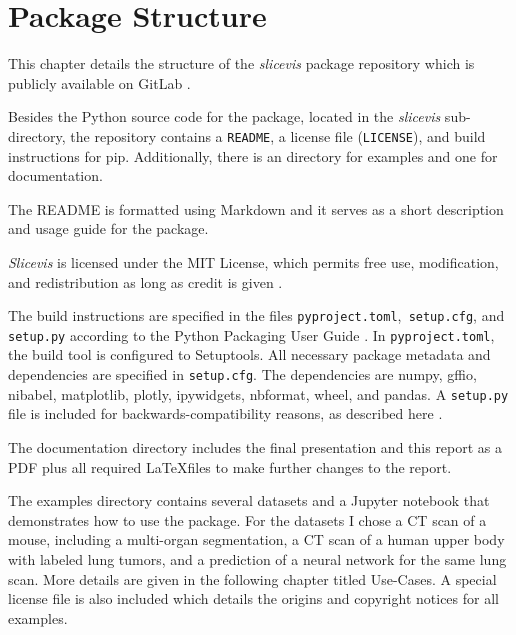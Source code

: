 \chapter{Package Structure}
This chapter details the structure of the \emph{slicevis} package repository which is publicly available on GitLab \cite{repo}.

Besides the Python source code for the package, located in the \emph{slicevis} sub-directory, the repository contains a \texttt{README}, a license file (\texttt{LICENSE}), and build instructions for pip. Additionally, there is an directory for examples and one for documentation. 

The README is formatted using Markdown and it serves as a short description and usage guide for the package. 

\emph{Slicevis} is licensed under the MIT License, which permits free use, modification, and redistribution as long as credit is given \cite{mit}. 

The build instructions are specified in the files \texttt{pyproject.toml},\texttt{ setup.cfg}, and \texttt{setup.py} according to the Python Packaging User Guide \cite{pypa}. In \texttt{pyproject.toml}, the build tool is configured to Setuptools. All necessary package metadata and dependencies are specified in \texttt{setup.cfg}. The dependencies are numpy, gffio, nibabel, matplotlib, plotly, ipywidgets, nbformat, wheel, and pandas. A \texttt{setup.py} file is included for backwards-compatibility reasons, as described here \cite{legacy_config}.

The documentation directory includes the final presentation and this report as a PDF plus all required \LaTeX files to make further changes to the report.

The examples directory contains several datasets and a Jupyter notebook that demonstrates how to use the package. For the datasets I chose a CT scan of a mouse, including a multi-organ segmentation, a CT scan of a human upper body with labeled lung tumors, and a prediction of a neural network for the same lung scan. More details are given in the following chapter titled Use-Cases. A special license file is also included which details the origins and copyright notices for all examples.